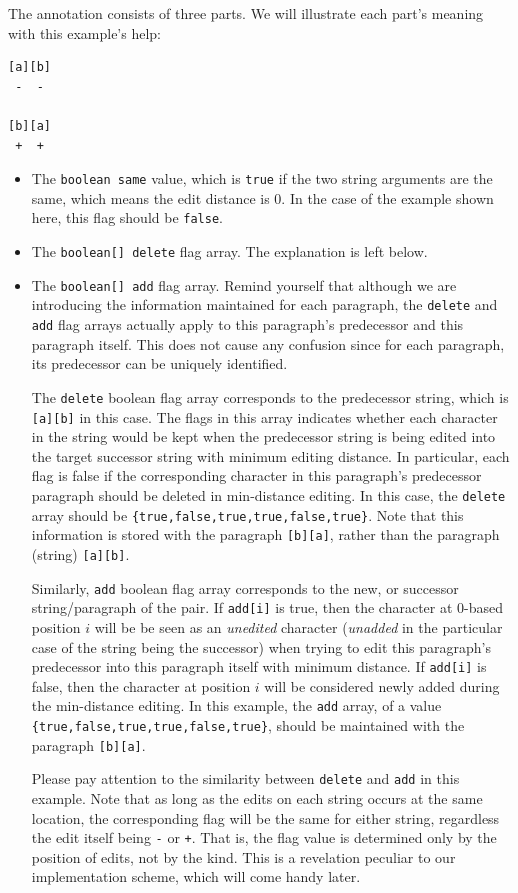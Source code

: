 \documentclass{article}
\begin{document}
\begin{enumerate}
\begin{itemize}
    The annotation consists of three parts. We will illustrate each part's meaning with this example's help:
    \begin{lstlisting}
[a][b]
 -  -

[b][a]
 +  +
    \end{lstlisting}
    \begin{itemize}
      \item The \texttt{boolean same} value, which is \texttt{true} if the two string arguments are the same, which means the edit distance is 0. In the case of the example shown here, this flag should be \texttt{false}.
      \item The \texttt{boolean[] delete} flag array. The explanation is left below.
      \item The \texttt{boolean[] add} flag array. Remind yourself that although we are introducing the information maintained for each paragraph, the \texttt{delete} and \texttt{add} flag arrays actually apply to this paragraph's predecessor and this paragraph itself. This does not cause any confusion since for each paragraph, its predecessor can be uniquely identified.

      The \texttt{delete} boolean flag array corresponds to the predecessor string, which is \texttt{[a][b]} in this case. The flags in this array indicates whether each character in the string would be kept when the predecessor string is being edited into the target successor string with minimum editing distance. In particular, each flag is false if the corresponding character in this paragraph's predecessor paragraph should be deleted in min-distance editing. In this case, the \texttt{delete} array should be \texttt{\{true,false,true,true,false,true\}}. Note that this information is stored with the paragraph \texttt{[b][a]}, rather than the paragraph (string) \texttt{[a][b]}.

      Similarly, \texttt{add} boolean flag array corresponds to the new, or successor string/paragraph of the pair. If \texttt{add[i]} is true, then the character at 0-based position $i$ will be be seen as an \textit{unedited} character (\textit{unadded} in the particular case of the string being the successor) when trying to edit this paragraph's predecessor into this paragraph itself with minimum distance. If \texttt{add[i]} is false, then the character at position $i$ will be considered newly added during the min-distance editing. In this example, the \texttt{add} array, of a value \texttt{\{true,false,true,true,false,true\}}, should be maintained with the paragraph \texttt{[b][a]}. 

      Please pay attention to the similarity between \texttt{delete} and \texttt{add} in this example. Note that as long as the edits on each string occurs at the same location, the corresponding flag will be the same for either string, regardless the edit itself being \texttt{-} or \texttt{+}. That is, the flag value is determined only by the position of edits, not by the kind. This is a revelation peculiar to our implementation scheme, which will come handy later.
    \end{itemize}
  \end{itemize}
\end{enumerate}
\end{document}
